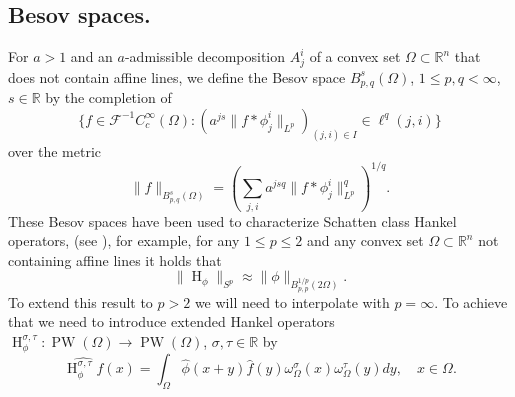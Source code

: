 \documentclass{amsart}
\theoremstyle{plain}
\DeclareMathOperator{\Ha}{H}
\DeclareMathOperator{\PW}{PW}
\begin{document}
\subsection*{Besov spaces.} 
For $a>1$ and an $a$-admissible decomposition $A_j^i$ of a convex set $\Omega\subset\mathbb{R}^n$ that does not contain affine lines, we define the Besov space $B_{p,q}^s(\Omega)$, $1\leq p,q<\infty$, $s\in\mathbb{R}$ by the completion of
$$\{f\in \mathcal{F}^{-1}C_c^\infty(\Omega):(a^{js}\|f\ast\phi_j^i\|_{L^p})_{(j,i)\in I}\in\ell^q(j,i)\}$$ over the metric
$$\|f\|_{B_{p,q}^s(\Omega)}=\left(\sum_{j,i}a^{jsq}\|f\ast\phi_j^i\|_{L^p}^q\right)^{1/q}.$$
These Besov spaces have been used to characterize Schatten class Hankel operators, (see \cite{bampouras2024besovspacesschattenclass}), for example, for any $1\leq p\leq 2$ and any convex set $\Omega\subset\mathbb{R}^n$ not containing affine lines it holds that
$$\|\Ha_\phi\|_{S^p}\approx \|\phi\|_{B_{p,p}^{1/p}(2\Omega)}.$$
To extend this result to $p>2$ we will need to interpolate with $p=\infty$. To achieve that we need to introduce extended Hankel operators $\Ha_\phi^{\sigma,\tau}:\PW(\Omega)\to \PW(\Omega)$, $\sigma,\tau\in\mathbb{R}$ by
$$\widehat{\Ha_\phi^{\sigma,\tau}f}(x)=\int_{\Omega}\widehat{\phi}(x+y)\hat{f}(y)\omega_{\Omega}^\sigma(x)\omega_\Omega^\tau(y)dy,\quad x\in\Omega.$$
\end{document}
